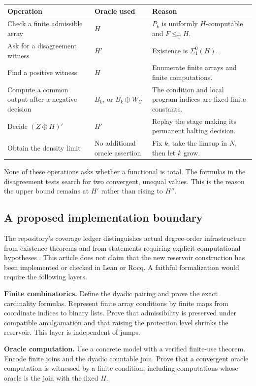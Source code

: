 \documentclass[11pt,letterpaper]{article}
\theoremstyle{definition}
\theoremstyle{remark}\newtheorem{remark}[theorem]{Remark}
\numberwithin{equation}{section}
\newcommand{\leT}{\leq_{\mathrm T}}
\begin{document}
\begin{center}\small
\begin{tabularx}{\textwidth}{@{}>{\raggedright\arraybackslash}p{}>{\raggedright\arraybackslash}p{}X@{}}
\toprule
Operation & Oracle used & Reason\\\midrule
Check a finite admissible array & $H$ & $P_k$ is uniformly $H$-computable and $F\leT H$.\\
Ask for a disagreement witness & $H'$ & Existence is $\Sigma^0_1(H)$.\\
Find a positive witness & $H$ & Enumerate finite arrays and finite computations.\\
Compute a common output after a negative decision & $B_k$, or $B_k\oplus W_U$ & The condition and local program indices are fixed finite constants.\\
Decide $(Z\oplus H)'$ & $H'$ & Replay the stage making its permanent halting decision.\\
Obtain the density limit & No additional oracle assertion & Fix $k$, take the limsup in $N$, then let $k$ grow.\\\bottomrule
\end{tabularx}
\end{center}
None of these operations asks whether a functional is total. The formulas in the disagreement tests search for two convergent, unequal values. This is the reason the upper bound remains at $H'$ rather than rising to $H''$.

\subsection{A proposed implementation boundary}\label{cr13:sec:implementation}
The repository's coverage ledger distinguishes actual degree-order infrastructure from existence theorems and from statements requiring explicit computational hypotheses \cite{Coverage}. This article does not claim that the new reservoir construction has been implemented or checked in Lean or Rocq. A faithful formalization would require the following layers.

\textbf{Finite combinatorics.} Define the dyadic pairing and prove the exact cardinality formulas. Represent finite array conditions by finite maps from coordinate indices to binary lists. Prove that admissibility is preserved under compatible amalgamation and that raising the protection level shrinks the reservoir. This layer is independent of jumps.

\textbf{Oracle computation.} Use a concrete model with a verified finite-use theorem. Encode finite joins and the dyadic countable join. Prove that a convergent oracle computation is witnessed by a finite condition, including computations whose oracle is the join with the fixed $H$.
\end{document}
